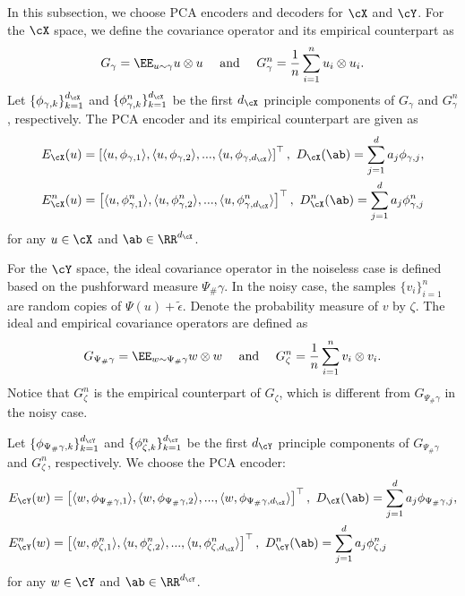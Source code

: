 \documentclass[11pt]{article} %
\begin{document}
In this subsection, we choose PCA encoders and decoders for $\cX$ and $\cY$. %
For the $\cX$ space, we define the covariance operator and its empirical counterpart as 
$$
G_{\gamma}=\EE_{u\sim \gamma} u\otimes u \quad \mbox{ and } \quad G^n_{\gamma}=\frac{1}{n}\sum_{i=1}^n u_i\otimes u_i.
$$
Let $\{\phi_{\gamma,k}\}_{k=1}^{d_{\cX}}$ and $\{\phi^n_{\gamma,k}\}_{k=1}^{d_{\cX}}$ be the first $d_{\cX}$ principle components of $G_{\gamma}$ and $G_{\gamma}^n$, respectively. The PCA encoder and its empirical counterpart are given as 
\begin{align}
	E_{\cX}(u)=\left[ \langle u,\phi_{\gamma,1}\rangle, \langle u,\phi_{\gamma,2}\rangle, ..., \langle u,\phi_{\gamma,d_{\cX}}\rangle\right]^{\top}, \ D_{\cX}(\ab)=\sum_{j=1}^d a_j\phi_{\gamma,j}, \label{eq.PCAX}\\
	E_{\cX}^n(u)=\left[ \langle u,\phi^n_{\gamma,1}\rangle, \langle u,\phi^n_{\gamma,2}\rangle, ..., \langle u,\phi^n_{\gamma,d_{\cX}}\rangle\right]^{\top}, \ D^n_{\cX}(\ab)=\sum_{j=1}^d a_j\phi^n_{\gamma,j} \label{eq.PCAX.n}
\end{align}
for any $u\in \cX$ and $\ab\in \RR^{d_{\cX}}$.

For the $\cY$ space, the ideal covariance operator in the noiseless case is defined based on the pushforward measure $\Psi_{\#}\gamma$. In the noisy case, the samples $\{v_i\}_{i=1}^n$ are random copies of $\Psi(u)+\widetilde{\epsilon}$. Denote the probability measure of $v$ by $\zeta$. The ideal and empirical covariance operators are defined as
$$
G_{\Psi_{\#}\gamma}=\EE_{w\sim \Psi_{\#}\gamma} w\otimes w \quad \mbox{ and } \quad G^n_{\zeta}=\frac{1}{n}\sum_{i=1}^n v_i\otimes v_i.
$$
Notice that $G^n_{\zeta}$ is the empirical counterpart of $G_{\zeta}$, which is different from $G_{\Psi_{\#}\gamma}$ in the noisy case.

Let  $\{\phi_{\Psi_{\#}\gamma,k}\}_{k=1}^{d_{\cY}}$ and $\{\phi^n_{\zeta,k}\}_{k=1}^{d_{\cY}}$ be the first $d_{\cY}$ principle components of $G_{\Psi_{\#}\gamma}$ and $G_{\zeta}^n$, respectively. We choose  the PCA encoder:
\begin{align}
	&E_{\cY}(w)=\left[ \langle w,\phi_{\Psi_{\#}\gamma,1}\rangle, \langle w,\phi_{\Psi_{\#}\gamma,2}\rangle, ..., \langle w,\phi_{\Psi_{\#}\gamma,d_{\cX}}\rangle\right]^{\top}, \ D_{\cX}(\ab)=\sum_{j=1}^d a_j\phi_{\Psi_{\#}\gamma,j}, \label{eq.PCAY}\\
	&E_{\cY}^n(w)=\left[ \langle w,\phi^n_{\zeta,1}\rangle, \langle u,\phi^n_{\zeta,2}\rangle, ..., \langle u,\phi^n_{\zeta,d_{\cX}}\rangle\right]^{\top}, \ D^n_{\cY}(\ab)=\sum_{j=1}^d a_j\phi^n_{\zeta,j} \label{eq.PCAY.n}
\end{align}
for any $w\in \cY$ and $\ab\in \RR^{d_{\cY}}$.
\end{document}
